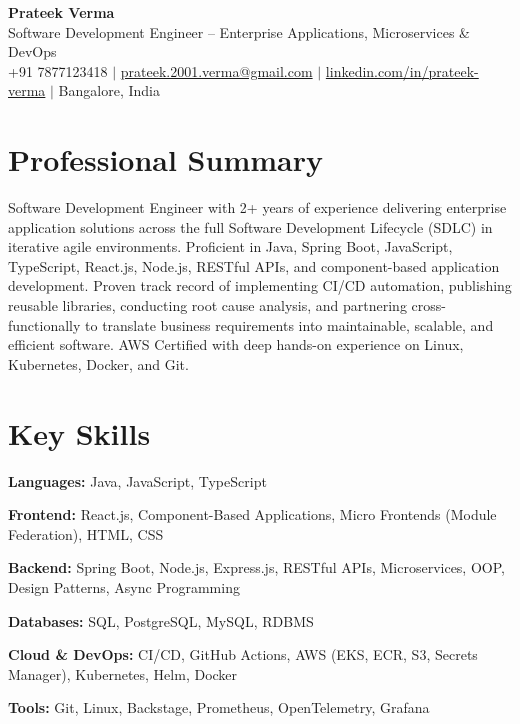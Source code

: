 \documentclass[letterpaper,10.5pt]{article}
\begin{document}
\begin{center}
  {\LARGE \textbf{Prateek Verma}} \\[4pt]
  \small Software Development Engineer -- Enterprise Applications, Microservices \& DevOps \\[4pt]
  +91 7877123418 \;$|$\;
  \href{mailto:prateek.2001.verma@gmail.com}{prateek.2001.verma@gmail.com} \;$|$\;
  \href{https://linkedin.com/in/prateek-verma-8125b3201}{linkedin.com/in/prateek-verma} \;$|$\;
  Bangalore, India
\end{center}

\section{Professional Summary}
\small{
Software Development Engineer with 2+ years of experience delivering enterprise application solutions across the full Software Development Lifecycle (SDLC) in iterative agile environments. Proficient in Java, Spring Boot, JavaScript, TypeScript, React.js, Node.js, RESTful APIs, and component-based application development. Proven track record of implementing CI/CD automation, publishing reusable libraries, conducting root cause analysis, and partnering cross-functionally to translate business requirements into maintainable, scalable, and efficient software. AWS Certified with deep hands-on experience on Linux, Kubernetes, Docker, and Git.
}

\section{Key Skills}
\begin{itemize}[leftmargin=0.15in, label={}, itemsep=-1pt]
  \small{
    \item \textbf{Languages:} Java, JavaScript, TypeScript
    \item \textbf{Frontend:} React.js, Component-Based Applications, Micro Frontends (Module Federation), HTML, CSS
    \item \textbf{Backend:} Spring Boot, Node.js, Express.js, RESTful APIs, Microservices, OOP, Design Patterns, Async Programming
    \item \textbf{Databases:} SQL, PostgreSQL, MySQL, RDBMS
    \item \textbf{Cloud \& DevOps:} CI/CD, GitHub Actions, AWS (EKS, ECR, S3, Secrets Manager), Kubernetes, Helm, Docker
    \item \textbf{Tools:} Git, Linux, Backstage, Prometheus, OpenTelemetry, Grafana
  }
\end{itemize}
\end{document}
